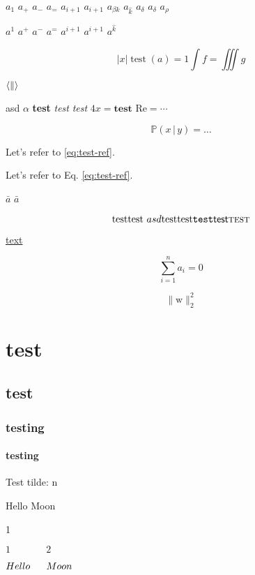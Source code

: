 \documentclass{minimal}
\begin{document}
$a_1$
$a_+$
$a_-$
$a_=$
$a_{i + 1}$
$a_{i+1}$
$a_{\beta k}$
$a_{\hat k}$
$a_{\delta}$
$a_\delta$
$a_\rho$

$a^1$
$a^+$
$a^-$
$a^=$
$a^{i + 1}$
$a^{i+1}$
$a^{\hat k}$

\begin{equation}
  \bigl\lvert x \bigr\rvert
  \operatorname{test}(a) = 1
  \int f = \iiint g
\end{equation}

$\langle \| \\ \rangle$

\textup{asd $\alpha$}
\textbf{test}
\textit{test}
\textsl{test}
$4 \mathit{x} = \mathbf{test}$
$\mathrm{Re} = \cdots$

\begin{equation}
  \mathbb{P}(x \,|\, y) \!= \dots
  \label{eq:test-ref}
\end{equation}

Let's refer to \eqref{eq:test-ref}.

Let's refer to Eq. \ref{eq:test-ref}.

$\bar a$
$\bar{a}$

\begin{equation}
  \text{test}
  \textnormal{test $asd$}
  \textrm{test}
  \textup{test}
  \texttt{test}
  \textsf{test}
  \textsc{test}
\end{equation}

\href{url}{text}


\begin{equation}
  \sum_{i=1}^n a_i = 0
\end{equation}

$$\lVert \mathrm{w} \rVert_2^2$$

\chapter{test}

\section{test}

\subsection{testing}

\subsubsection{testing}

Test tilde: \tilde n

Hello
\thinspace
\medspace
\thickspace
\bigskip
\hspace{1em}
\hfill
\vspace{1em}
\vfill
Moon

1 \, \: \; \! \quad {}

$1 \, \: \; \! \quad \qquad 2$

$Hello
\thinspace
\medspace
\thickspace
\bigskip
\hspace{1em}
\hfill
\vspace{1em}
Moon$
\end{document}
